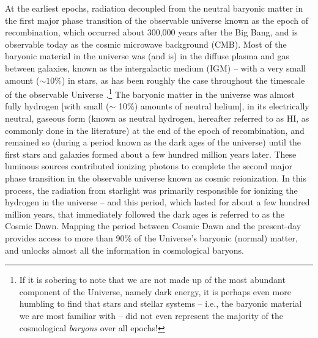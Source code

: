 At the earliest epochs, radiation decoupled from the neutral baryonic matter in the first major phase transition of the observable universe known as the epoch of recombination, which occurred about 300,000 years after the Big Bang, and is observable today as the cosmic microwave background (CMB). Most of the baryonic material in the universe was (and is) in the diffuse plasma and gas between galaxies, known as the intergalactic medium (IGM) -- with a very small amount ($\sim 10\%$) in stars, as has been roughly the case throughout the timescale of the observable Universe \cite{shull2012, famaey2012}.\footnote{If it is sobering to note that we are not made up of the most abundant component of the Universe, namely dark energy, it is perhaps even more humbling to find that stars and stellar systems -- i.e., the baryonic material we are most familiar with -- did not even represent the majority of the cosmological \textit{baryons} over all epochs!}  The baryonic matter in the universe was almost fully hydrogen [with small ($\sim$ 10\%) amounts of neutral helium], in its electrically neutral, gaseous form (known as neutral hydrogen, hereafter referred to as HI, as commonly done in the literature) at the end of the epoch of recombination, and remained so (during a period known as the dark ages of the universe) until the first stars and galaxies formed about a few hundred million years later. These luminous sources contributed ionizing photons to complete the second major phase transition in the observable universe known as cosmic reionization. In this process, the radiation from starlight was primarily responsible for ionizing the hydrogen in the universe – and this period, which lasted for about a few hundred million years, that immediately followed the dark ages is referred to as the Cosmic Dawn. Mapping the period between Cosmic Dawn and the present-day provides access to more than 90\% of the Universe's baryonic (normal) matter, and unlocks almost all the information in cosmological baryons.

